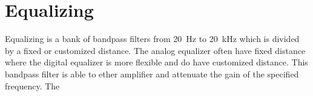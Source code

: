 \section{Equalizing}
Equalizing is a bank of bandpass filters from \SI{20}{\hertz} to \SI{20}{\kilo\hertz} which is divided by a fixed or customized distance. The analog equalizer often have fixed distance where the digital equalizer is more flexible and do have customized distance. This bandpass filter is able to ether amplifier and attenuate the gain of the specified frequency. The %